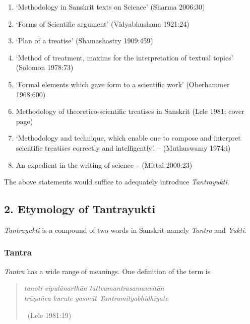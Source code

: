 \begin{enumerate}[{\rm i)}]
\itemsep=0pt
\item ‘Methodology in Sanskrit texts on Science’ (Sharma 2006:30)

 \item ‘Forms of Scientific argument’ (Vidyabhushana 1921:24) 

 \item ‘Plan of a treatise’ (Shamashastry 1909:459)

 \item ‘Method of treatment, maxims for the interpretation of textual topics’ (Solomon 1978:73) 

 \item ‘Formal elements which gave form to a scientific work’ (Oberhammer 1968:600)

 \item Methodology of theoretico-scientific treatises in Sanskrit (Lele 1981: cover page)

 \item ‘Methodology and technique, which enable one to compose and interpret scientific treatises correctly and intelligently’. – (Muthuswamy 1974:i)

 \item An expedient in the writing of science – (Mittal 2000:23)

\end{enumerate}

The above statements would suffice to adequately introduce \textit{Tantra\-yukti}.


\subsection*{2. Etymology of Tantrayukti}

\vskip -6pt

\textit{Tantrayukti} is a compound of two words in Sanskrit namely \textit{Tantra} and \textit{Yukti}.

\subsubsection*{Tantra}

\vskip -5pt

\textit{Tantra} has a wide range of meanings. One definition of the term is

\vskip -6pt

\begin{verse}
\textit{tanoti vipulānarthān tattvamantrasamanvitān }\\\textit{ trāṇañca kurute yasmāt Tantramityabhidhīyate }

~\hfill (Lele 1981:19)
\end{verse}

